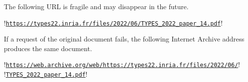 \begin{example}

The following URL is fragile and may disappear in the future.

\begin{center}
\begin{minipage}{\textwidth}
\begin{browserlisting}
!\texttt{\url{https://types22.inria.fr/files/2022/06/TYPES_2022_paper_14.pdf}}!
\end{browserlisting}
\end{minipage}
\end{center}

If a request of the original document fails, the following Internet Archive
address produces the same document.

\begin{center}
\begin{minipage}{\textwidth}
\begin{browserlisting}
!\texttt{\href{https://web.archive.org/web/https://types22.inria.fr/files/2022/06/}{https://web.archive.org/web/https://types22.inria.fr/files/2022/06/}}!
!\hspace{2em}\texttt{\href{https://web.archive.org/web/https://types22.inria.fr/files/2022/06/TYPES_2022_paper_14.pdf}{TYPES\_2022\_paper\_14.pdf}}!

\end{browserlisting}
\end{minipage}
\end{center}
\end{example}
